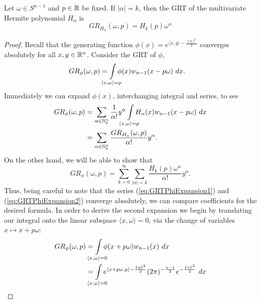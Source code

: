 \begin{proposition} \label{prop:GRTHermite}
  Let $\omega \in S^{n-1}$ and $p \in \mathbb{R}$ be fixed. If $|\alpha| = k$, then the GRT of the multivariate Hermite polynomial $H_\alpha$ is
  \[
    GR_{H_\alpha}(\omega, p) = H_k(p)\omega^\alpha
  \]
\end{proposition}

\begin{proof}
  Recall that the generating function $\phi(x) = e^{\langle x, y\rangle - \frac{\|y\|^2}2}$ converges absolutely for all $x,y \in \mathbb{R}^n$. Consider the GRT of $\phi$,
  \begin{align*}
    GR_{\phi}(\omega, p) 
      &= \int\mclimits_{\langle x, \omega \rangle = p} \phi(x) w_{n-1}(x - p\omega)~dx.
  \end{align*}
  Immediately we can expand $\phi(x)$, interchanging integral and series, to see
  \begin{equation} \label{eq:GRTPhiExpansion1}
    \begin{split}
      GR_{\phi}(\omega, p)
        &= \sum_{\alpha \in \NN_0^n} \frac1{\alpha!} y^\alpha \int\mclimits_{\langle x, \omega\rangle = p} H_\alpha(x) w_{n-1}(x - p\omega)~dx
      \\&= \sum_{\alpha \in \NN_0^n} \frac{GR_{H_\alpha}(\omega, p)}{\alpha!} y^\alpha.
    \end{split}
  \end{equation}
  On the other hand, we will be able to show that
  \begin{equation} \label{eq:GRTPhiExpansion2}
    GR_{\phi}(\omega, p) 
    = \sum_{k = 0}^\infty \sum_{|\alpha| = k} \frac{H_k(p)\omega^\alpha}{\alpha!} y^\alpha.
  \end{equation}
  Thus, being careful to note that the series (\ref{eq:GRTPhiExpansion1}) and (\ref{eq:GRTPhiExpansion2}) converge absolutely, we can compare coefficients for the desired formula. In order to derive the second expansion we begin by translating our integral onto the linear subspace $\langle x, \omega\rangle = 0$, via the change of variables $x \mapsto x + p\omega$:
  \begin{equation}\label{eq:GRTPhiExpansion21}
    \begin{split}
      GR_{\phi}(\omega, p) 
        &= \int\mclimits_{\langle x, \omega\rangle = 0} \phi(x + p\omega) w_{n-1}(x) ~dx 
      \\&= \int\mclimits_{\langle x, \omega\rangle = 0} e^{\langle x + p\omega, y \rangle - \frac{\|y\|^2}2}(2\pi)^{-\frac{n-1}2}e^{-\frac{\|x\|^2}2} ~dx

\end{split}
\end{equation}
\end{proof}
